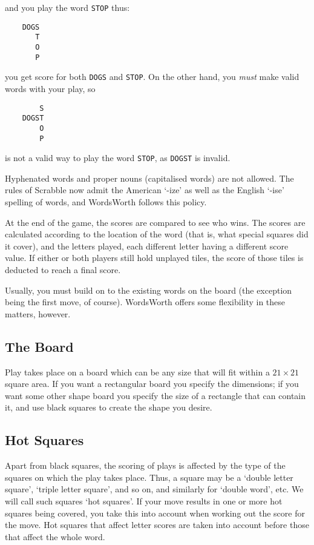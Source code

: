 and you play the word {\tt STOP} thus:

\begin{verbatim}
    DOGS
       T
       O
       P
\end{verbatim}

you get score for both {\tt DOGS} and {\tt STOP}. On the other hand, you 
{\em must} make valid words with your play, so

\begin{verbatim}
        S
    DOGST
        O
        P
\end{verbatim}

is not a valid way to play the word {\tt STOP}, as {\tt DOGST} is invalid.

Hyphenated words and proper nouns (capitalised words) are not
allowed. The rules of Scrabble now admit the American `-ize' as well
as the English `-ise' spelling of words, and WordsWorth follows this
policy.

At the end of the game, the scores are compared to see who wins.
The scores are calculated according to the location of the word
(that is, what special squares did it cover), and the letters
played, each different letter having a different score value.
If either or both players still hold unplayed tiles, the score 
of those tiles is deducted to reach a final score.

Usually, you must build on to the existing words on the board
(the exception being the first move, of course). WordsWorth
offers some flexibility in these matters, however.

\subsection{The Board}

Play takes place on a board which can be any size that will fit
within a $21\times21$ square area. If you want a rectangular board you
specify the dimensions; if you want some other shape board you 
specify the size of a rectangle that can contain it, and use
black squares to create the shape you desire.

\subsection{Hot Squares}

Apart from black squares, the scoring of plays is affected by the
type of the squares on which the play takes place. Thus, a square 
may be a `double letter square', `triple letter square',
and so on, and similarly for `double word', etc. We will call such
squares `hot squares'. If your move
results in one or more hot squares being covered,
you take this into account when working out the score for the move.
Hot squares that affect letter scores are taken into account before those
that affect the whole word.

